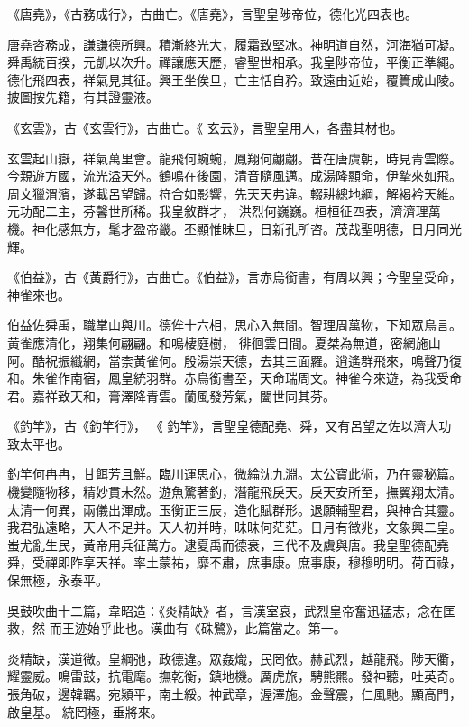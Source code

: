 \begin{pinyinscope}
 《唐堯》，《古務成行》，古曲亡。《唐堯》，言聖皇陟帝位，德化光四表也。



 唐堯咨務成，謙謙德所興。積漸終光大，履霜致堅冰。神明道自然，河海猶可凝。舜禹統百揆，元凱以次升。禪讓應天歷，睿聖世相承。我皇陟帝位，平衡正準繩。德化飛四表，祥氣見其征。興王坐俟旦，亡主恬自矜。致遠由近始，覆簣成山陵。披圖按先籍，有其證靈液。



 《玄雲》，古《玄雲行》，古曲亡。《
 玄云》，言聖皇用人，各盡其材也。



 玄雲起山嶽，祥氣萬里會。龍飛何蜿蜿，鳳翔何翽翽。昔在唐虞朝，時見青雲際。今親遊方國，流光溢天外。鶴鳴在後園，清音隨風邁。成湯隆顯命，伊摯來如飛。周文獵渭濱，遂載呂望歸。符合如影響，先天天弗違。輟耕總地綱，解褐衿天維。元功配二主，芬馨世所稀。我皇敘群才，
 洪烈何巍巍。桓桓征四表，濟濟理萬機。神化感無方，髦才盈帝畿。丕顯惟昧旦，日新孔所咨。茂哉聖明德，日月同光輝。



 《伯益》，古《黃爵行》，古曲亡。《伯益》，言赤烏銜書，有周以興；今聖皇受命，神雀來也。



 伯益佐舜禹，職掌山與川。德侔十六相，思心入無間。智理周萬物，下知眾鳥言。黃雀應清化，翔集何翩翩。和鳴棲庭樹，
 徘徊雲日間。夏桀為無道，密網施山阿。酷祝振纖網，當柰黃雀何。殷湯崇天德，去其三面羅。逍遙群飛來，鳴聲乃復和。朱雀作南宿，鳳皇統羽群。赤鳥銜書至，天命瑞周文。神雀今來遊，為我受命君。嘉祥致天和，膏澤降青雲。蘭風發芳氣，闔世同其芬。


《釣竿》，古《釣竿行》，
 《
 釣竿》，言聖皇德配堯、舜，又有呂望之佐以濟大功致太平也。



 釣竿何冉冉，甘餌芳且鮮。臨川運思心，微綸沈九淵。太公寶此術，乃在靈秘篇。機變隨物移，精妙貫未然。遊魚驚著釣，潛龍飛戾天。戾天安所至，撫翼翔太清。太清一何異，兩儀出渾成。玉衡正三辰，造化賦群形。退願輔聖君，與神合其靈。
 我君弘遠略，天人不足并。天人初并時，昧昧何茫茫。日月有徵兆，文象興二皇。蚩尤亂生民，黃帝用兵征萬方。逮夏禹而德衰，三代不及虞與唐。我皇聖德配堯舜，受禪即阼享天祥。率土蒙祐，靡不肅，庶事康。庶事康，穆穆明明。荷百祿，保無極，永泰平。



 吳鼓吹曲十二篇，韋昭造：《炎精缺》者，言漢室衰，武烈皇帝奮迅猛志，念在匡救，然
 而王迹始乎此也。漢曲有《硃鷺》，此篇當之。第一。



 炎精缺，漢道微。皇綱弛，政德違。眾姦熾，民罔依。赫武烈，越龍飛。陟天衢，耀靈威。鳴雷鼓，抗電麾。撫乾衡，鎮地機。厲虎旅，騁熊羆。發神聽，吐英奇。張角破，邊韓羈。宛潁平，南土綏。神武章，渥澤施。金聲震，仁風馳。顯高門，啟皇基。
 統罔極，垂將來。




\end{pinyinscope}
